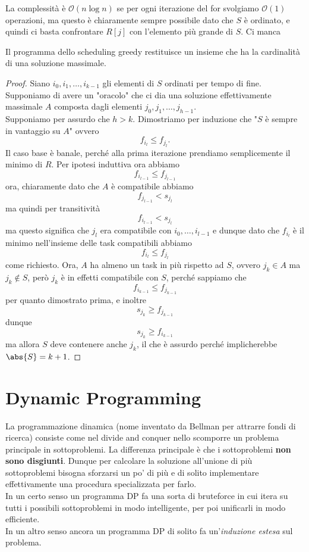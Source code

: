 \documentclass[11pt]{scrartcl}
\newcommand{\bigo}{\mathcal{O}}
\begin{document}
	La complessità è $\bigo(n\log n)$ se per ogni iterazione del for svolgiamo $\bigo(1)$ operazioni, ma questo è chiaramente sempre possibile dato che $S$ è ordinato, e quindi ci basta confrontare $R[j]$ con l'elemento più grande di $S$. Ci manca
	\begin{lemma}
		Il programma dello scheduling greedy restituisce un insieme che ha la cardinalità di una soluzione massimale.
	\end{lemma}
	\begin{proof}
		Siano $i_0,i_1,\dots,i_{k-1}$ gli elementi di $S$ ordinati per tempo di fine. 
		Supponiamo di avere un "oracolo" che ci dia una soluzione effettivamente massimale $A$ composta dagli elementi $j_0,j_1,\dots ,j_{h-1}$. \\
		Supponiamo per assurdo che $h>k$. Dimostriamo per induzione che "$S$ è sempre in vantaggio su $A$" ovvero
		$$f_{i_l}\le f_{j_l}.$$
		Il caso base è banale, perché alla prima iterazione prendiamo semplicemente il minimo di $R$. Per ipotesi induttiva ora abbiamo
		$$f_{i_{l-1}}\le f_{j_{l-1}}$$
		ora, chiaramente dato che $A$ è compatibile abbiamo
		$$f_{j_{l-1}} < s_{j_l}$$
		ma quindi per transitività
		$$f_{i_{l-1}} < s_{j_l}$$
		ma questo significa che $j_l$ era compatibile con $i_0,\dots,i_{l-1}$ e dunque dato che $f_{i_l}$ è il minimo nell'insieme delle task compatibili abbiamo
		$$f_{i_l}\le f_{j_l}$$
		come richiesto. Ora, $A$ ha almeno un task in più rispetto ad $S$, ovvero $j_k\in A$ ma $j_k\not\in S$, però $j_k$ è in effetti compatibile con $S$, perché sappiamo che
		$$f_{i_{k-1}}\le f_{j_{k-1}}$$
		per quanto dimostrato prima, e inoltre 
		$$s_{j_k}\ge f_{j_{k-1}}$$
		dunque 
		$$s_{j_k}\ge f_{i_{k-1}}$$
		ma allora $S$ deve contenere anche $j_k$, il che è assurdo perché implicherebbe $\abs{S}=k+1$.
	\end{proof}
	
	
	\newpage
	
	\section{Dynamic Programming}
	
	La programmazione dinamica (nome inventato da Bellman per attrarre fondi di ricerca) consiste come nel divide and conquer nello scomporre un problema principale in sottoproblemi. La differenza principale è che i sottoproblemi \textbf{non sono disgiunti}. Dunque per calcolare la soluzione all'unione di più sottoproblemi bisogna sforzarsi un po' di più e di solito implementare effettivamente una procedura specializzata per farlo. \\
	In un certo senso un programma DP fa una sorta di bruteforce in cui itera su tutti i possibili sottoproblemi in modo intelligente, per poi unificarli in modo efficiente. \\
	In un altro senso ancora un programma DP di solito fa un'\textit{induzione estesa} sul problema.
	
\end{document}
